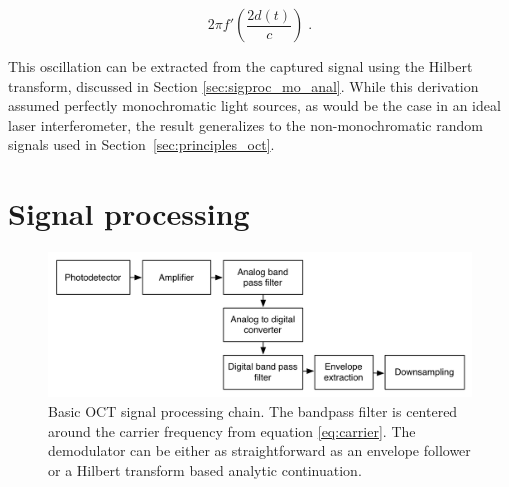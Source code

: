 \begin{equation}
2 \pi f' \left( \frac{2 d(t)}{c} \right) \; .
\end{equation}

This oscillation can be extracted from the captured signal using the Hilbert transform, discussed in Section \ref{sec:sigproc_mo_anal}. While this derivation assumed perfectly monochromatic light sources, as would be the case in an ideal laser interferometer, the result generalizes to the non-monochromatic random signals used in Section~\ref{sec:principles_oct}.

\section{Signal processing}


\begin{figure}[h!]
  \centering
  \includegraphics[width=1.0\textwidth]{Images/background/basic_dsp.png}
\caption[Basic OCT signal processing chain.]{Basic OCT signal processing chain. The bandpass filter is centered around the carrier frequency from equation \ref{eq:carrier}. The demodulator can be either as straightforward as an envelope follower or a Hilbert transform based analytic continuation.}
\end{figure}

